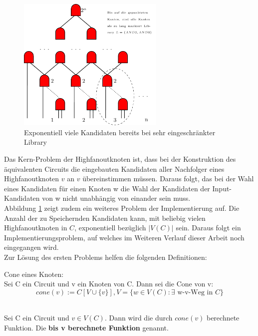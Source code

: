 \documentclass[11pt, a4paper, german]{article}
\begin{document}
\begin{figure}%
\includegraphics[width= 7cm]{pictures/compiled/expo_kand}
\caption{Exponentiell viele Kandidaten bereits bei sehr eingeschränkter Library}
\label{bild:expo_kan}
\end{figure}

Das Kern-Problem der Highfanoutknoten ist, dass bei der Konstruktion des äquivalenten Circuits die eingebauten Kandidaten aller Nachfolger eines Highfanoutknoten $v$ an $v$ übereinstimmen müssen. Daraus folgt, das bei der Wahl eines Kandidaten für einen Knoten w die Wahl der Kandidaten der Input-Kandidaten von w nicht unabhängig von einander sein muss. \\
Abbildung \ref{bild:expo_kan} zeigt zudem ein weiteres Problem der Implementierung auf. Die Anzahl der zu Speichernden Kandidaten kann, mit beliebig vielen Highfanoutknoten in $C$,  exponentiell bezüglich $|V(C)|$ sein. Daraus folgt ein Implementierungsproblem, auf welches im Weiteren Verlauf dieser Arbeit noch eingegangen wird. \\
Zur Lösung des ersten Problems helfen die folgenden Definitionen:\\

\begin{definition}{Cone eines Knoten:}\\
	Sei C ein Circuit und v ein Knoten von C. Dann sei die Cone von v: 
	\[ cone(v) := C[V \cup \{ v \}], V = \{ w \in V(C) : \exists \text{ w-v-Weg in }  C \} \] \end{definition}
\begin{definition}\  \\
	Sei C ein Circuit und  $v \in V(C)$. Dann wird die durch $cone(v)$ berechnete Funktion. Die 			{\bf bis v berechnete Funktion} genannt.
\end{definition}
\end{document}
